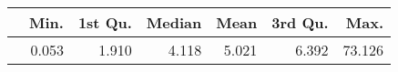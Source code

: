 \begin{table}[ht]
\centering
\begin{tabular}{rrrrrrr}
  \hline
 & Min. & 1st Qu. & Median & Mean & 3rd Qu. & Max. \\ 
  \hline
 & 0.053 & 1.910 & 4.118 & 5.021 & 6.392 & 73.126 \\ 
   \hline
\end{tabular}
\end{table}
